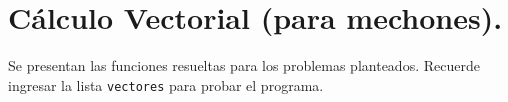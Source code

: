 \section{Cálculo Vectorial (para mechones).}

  Se presentan las funciones resueltas para los problemas planteados. Recuerde ingresar la lista \texttt{vectores} para probar el programa.
  
  